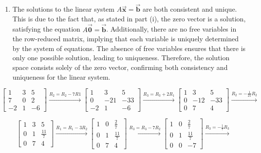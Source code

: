\documentclass[letter,11pt]{article}
\begin{document}
\begin{tcolorbox}[boxrule=1mm, width=(.9\linewidth),before=\hfill,after=\hfill,adjusted title={Problem \# 5 Solutions}]
\begin{enumerate}[label = \roman*.]
    \item The solutions to the linear system $A \vec{\boldsymbol{x}} = \vec{\boldsymbol{b}}$ are both consistent and unique. This is due to the fact that, as stated in part (i), the zero vector is a solution, satisfying the equation $A \vec{\boldsymbol{0}} = \vec{\boldsymbol{b}}$. Additionally, there are no free variables in the row-reduced matrix, implying that each variable is uniquely determined by the system of equations. The absence of free variables ensures that there is only one possible solution, leading to uniqueness. Therefore, the solution space consists solely of the zero vector, confirming both consistency and uniqueness for the linear system.
\end{enumerate}

\tcblower 
$$\begin{bmatrix}
1 & 3 & 5 \\
7 & 0 &  2\\
-2 & 1 & -6
\end{bmatrix} \xrightarrow{R_2 = R_2-7R1}
\begin{bmatrix}
1 & 3 & 5 \\
0 & -21 &  -33\\
-2 & 1 & -6
\end{bmatrix}\xrightarrow{R_3 = R_3 +2R_1}
\begin{bmatrix}
1 & 3 & 5 \\
0 & -12 &  -33\\
0 & 7 & 4
\end{bmatrix}\xrightarrow{R_{2}=-\frac{1}{21}R_2}$$

$$\begin{bmatrix}
1 & 3 & 5 \\
0 & 1 &  \frac{11}{7}\\
0 & 7 & 4
\end{bmatrix} \xrightarrow{R_1=R_1-3R_2}
\begin{bmatrix}
1 & 0 & \frac{2}{7} \\
0 & 1 &  \frac{11}{7}\\
0 & 7 & 4
\end{bmatrix}\xrightarrow{R_3=R_3-7R_2}
\begin{bmatrix}
1 & 0 & \frac{2}{7} \\
0 & 1 &  \frac{11}{7}\\
0 & 0 & -7
\end{bmatrix}\xrightarrow{R_3=-\frac{1}{7}R_3}$$


\end{tcolorbox}
\end{document}

